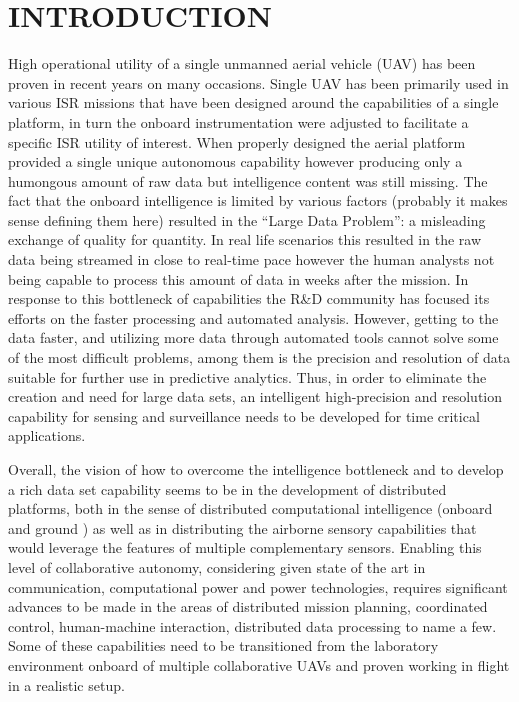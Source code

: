 \documentclass[letterpaper, 10 pt, conference]{ieeeconf}  %
\begin{document}
\section{INTRODUCTION}
High operational utility of a single unmanned aerial vehicle (UAV) has been proven in recent years on many occasions.  Single UAV has been primarily used in various ISR missions  that have been designed around the capabilities of a single platform, in turn the onboard instrumentation were adjusted to facilitate a specific ISR utility of interest.  When properly designed the aerial platform provided a single unique autonomous capability however producing only a humongous amount of raw data  but intelligence content was still missing. The fact that the onboard intelligence is limited by various factors (probably it makes sense defining them here) resulted in the ``Large Data Problem'': a misleading exchange of quality for quantity. In real life scenarios this resulted in the raw data being streamed in close to real-time pace however the human analysts not being capable to process this amount of data in weeks after the mission. In response to this bottleneck of capabilities the R\&D community has focused its efforts on the faster processing and automated analysis. However, getting to the data faster, and utilizing more data through automated tools cannot solve some of the most difficult problems, among them is the precision and resolution of  data suitable for further use in predictive analytics. Thus, in order to eliminate the creation and need for large data sets, an intelligent high-precision and resolution capability for sensing and surveillance needs to be developed for time critical applications.


Overall, the vision of how to overcome the intelligence bottleneck and to develop a rich data set capability seems to be in the development of distributed platforms, both in the sense of distributed computational intelligence (onboard and ground ) as well as in distributing the airborne sensory capabilities that would leverage the features of multiple complementary sensors. Enabling this level of collaborative autonomy, considering given state of the art in communication, computational power and power technologies,  requires significant advances to be made in the areas of distributed mission planning, coordinated control, human-machine interaction, distributed data processing to name a few. Some of these capabilities need to be transitioned from the laboratory environment onboard of multiple collaborative UAVs and proven working in flight in a realistic setup. 
\end{document}
